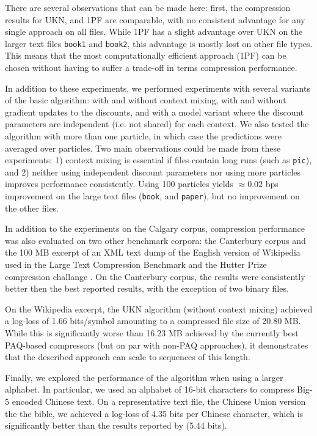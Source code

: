 \resultstable

There are several observations that can be made here: first, the compression results 
for UKN, and  1PF are comparable, with no consistent advantage for
any single approach on all files. While 1PF has a slight advantage over UKN on the
larger text files \texttt{book1} and \texttt{book2}, this advantage is mostly
lost on other file types.  This means that the most computationally efficient approach
(1PF) can be chosen without having to suffer a trade-off in terms compression performance.

In addition to these experiments, we performed experiments with several
variants of the basic algorithm: with and without context mixing, with and
without gradient updates to the discounts, and with a model variant where the discount
parameters are independent (i.e. not shared) for each context. We also tested
the algorithm with more than one particle, in which case the predictions were
averaged over particles. Two main observations could be made from these
experiments: 1) context mixing is essential if files contain long runs (such as
\texttt{pic}), and 2) neither using independent discount parameters nor using
more particles improves performance consistently. Using 100 particles yields
$\approx 0.02$ bps improvement on the large text files (\texttt{book}, and
\texttt{paper}), but no improvement on the other files.

In addition to the experiments on the Calgary corpus, compression performance
was also evaluated on two other benchmark corpora: the Canterbury corpus
\citep{canterbury} and the 100 MB excerpt of an XML text dump of the English
version of Wikipedia used in the Large Text Compression Benchmark
\citep{largetext} and the Hutter Prize compression challange \citep{hutter}. 
On the Canterbury corpus, the results were consistently better then the best
reported results, with the exception of two binary files. 

On the Wikipedia excerpt, the UKN algorithm (without context mixing) 
achieved a log-loss of 1.66 bits/symbol
amounting to a compressed file size of 20.80 MB. While this is significantly
worse than 16.23 MB achieved by the currently best PAQ-based compressors (but
on par with non-PAQ approaches), it demonstrates that the described approach 
can scale to sequences of this length.%

Finally, we explored the performance of the algorithm when using a larger alphabet.
In particular, we used an alphabet of 16-bit characters to compress Big-5
encoded Chinese text. On a representative text file, the Chinese Union version
the the bible, we achieved a log-loss of 4.35 bits per Chinese character,
which is significantly better than the results reported by \citet{ppmchinese}
(5.44 bits).

